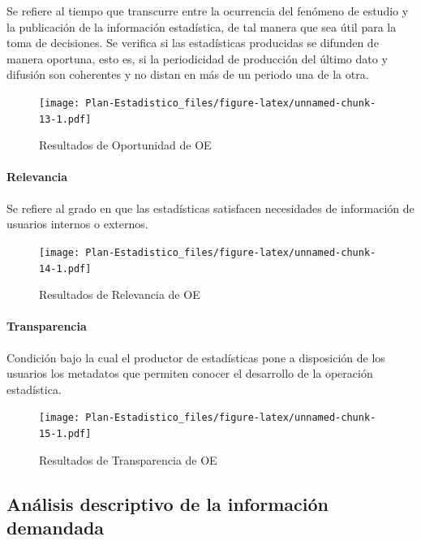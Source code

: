 \documentclass[
]{book}
\begin{document}
Se refiere al tiempo que transcurre entre la ocurrencia del fenómeno de estudio y la publicación de la información estadística, de tal manera que sea útil para la toma de decisiones. Se verifica si las estadísticas producidas se difunden de manera oportuna, esto es, si la periodicidad de producción del último dato y difusión son coherentes y no distan en más de un periodo una de la otra.

\begin{figure}
\centering
\texttt{[image: Plan-Estadistico\_files/figure-latex/unnamed-chunk-13-1.pdf]}
\caption{\label{fig:unnamed-chunk-13}Resultados de Oportunidad de OE}
\end{figure}

\hypertarget{relevancia}{%
\paragraph{Relevancia}\label{relevancia}}

Se refiere al grado en que las estadísticas satisfacen necesidades de información de
usuarios internos o externos.

\begin{figure}
\centering
\texttt{[image: Plan-Estadistico\_files/figure-latex/unnamed-chunk-14-1.pdf]}
\caption{\label{fig:unnamed-chunk-14}Resultados de Relevancia de OE}
\end{figure}

\hypertarget{transparencia}{%
\paragraph{Transparencia}\label{transparencia}}

Condición bajo la cual el productor de estadísticas pone a disposición de los
usuarios los metadatos que permiten conocer el desarrollo de la operación estadística.

\begin{figure}
\centering
\texttt{[image: Plan-Estadistico\_files/figure-latex/unnamed-chunk-15-1.pdf]}
\caption{\label{fig:unnamed-chunk-15}Resultados de Transparencia de OE}
\end{figure}

\hypertarget{anuxe1lisis-descriptivo-de-la-informaciuxf3n-demandada}{%
\subsection{Análisis descriptivo de la información demandada}\label{anuxe1lisis-descriptivo-de-la-informaciuxf3n-demandada}}
\end{document}
